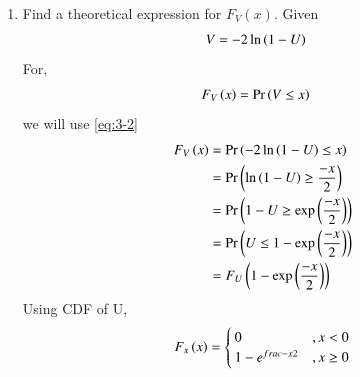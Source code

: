 \documentclass[journal,12pt,twocolumn]{IEEEtran}
\renewcommand\thesection{\arabic{section}}
\begin{document}
\begin{enumerate}[label=\thesection.\arabic*,ref=\thesection.\theenumi]
\item Find a theoretical expression for $F_V(x)$.
\solution Given 
\begin{align}
	V &= -2\ln\left(1-U\right) \label{eq: 3-2}
\end{align}
 For, 
 \begin{align}
	 F_V\left(x\right) &= \Pr\left(V\leq x\right)
 \end{align}
 we will use \eqref{eq:3-2}
 \begin{align}
	 F_V\left(x\right) &= \Pr\left(-2\ln\left(1-U\right) \leq x\right)\\
	             &= \Pr\left( \ln\left(1-U\right) \geq \frac{-x}{2}\right)\\
		           &= \Pr\left(  1-U \geq \exp\left(\frac{-x}{2}\right)\right)\\
		           &= \Pr\left( U \leq 1 - \exp\left(\frac{-x}{2}\right)\right)\\
               &= F_U\left(1-\exp\left(\frac{-x}{2}\right)\right)\\
 \end{align}
 Using CDF of U,
 \begin{equation*}
         F_{x}\left(x\right) = \begin{cases}
                            0  &, x < 0 \\
                            1 - e^{frac{-x}{2}}  &, x\geq 0 
                         \end{cases}
\end{equation*}


%
\end{enumerate}
\end{document}
